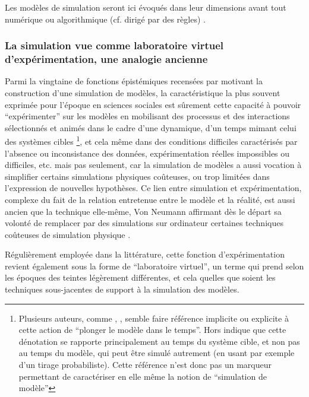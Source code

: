 Les modèles de simulation seront ici évoqués dans leur dimensions avant tout numérique ou algorithmique (cf. dirigé par des règles) \autocite[36-38]{Varenne2013}.

\subsubsection{La simulation vue comme laboratoire virtuel d'expérimentation, une analogie ancienne}

Parmi la vingtaine de fonctions épistémiques recensées par \textcite[14-23]{Varenne2013} motivant la construction d'une simulation de modèles, la caractéristique la plus souvent exprimée pour l'époque en sciences sociales est sûrement cette capacité à pouvoir \enquote{expérimenter} sur les modèles en mobilisant des processus et des interactions sélectionnés et animés dans le cadre d'une dynamique, d'un temps mimant celui des systèmes cibles \footnote{Plusieurs auteurs, comme \autocite[462]{Gullahorn1965}, \autocite[296]{Doran1970}, \autocite[294-295]{Batty1976} semble faire référence implicite ou explicite à cette action de \enquote{plonger le modèle dans le temps}. Hors \autocite[31]{Varenne2013} indique que cette dénotation se rapporte principalement au temps du système cible, et non pas au temps du modèle, qui peut être simulé autrement (en usant par exemple d'un tirage probabiliste). Cette référence n'est donc pas un marqueur permettant de caractériser en elle même la notion de \enquote{simulation de modèle}}, et cela même dans des conditions difficiles caractérisés par l'absence ou inconsistance des données, expérimentation réelles impossibles ou difficiles, etc. mais pas seulement, car la simulation de modèles a aussi vocation à simplifier certains simulations physiques coûteuses, ou trop limitées dans l'expression de nouvelles hypothèses. Ce lien entre simulation et expérimentation, complexe du fait de la relation entretenue entre le modèle et la réalité, est aussi ancien que la technique elle-même, Von Neumann affirmant dès le départ sa volonté de remplacer par des simulations sur ordinateur certaines techniques coûteuses de simulation physique \autocite[15]{Winsberg2013}.

Régulièrement employée dans la littérature, cette fonction d’expérimentation revient également sous la forme de \enquote{laboratoire virtuel}, un terme qui prend selon les époques des teintes légèrement différentes, et cela quelles que soient les techniques sous-jacentes de support à la simulation des modèles.

